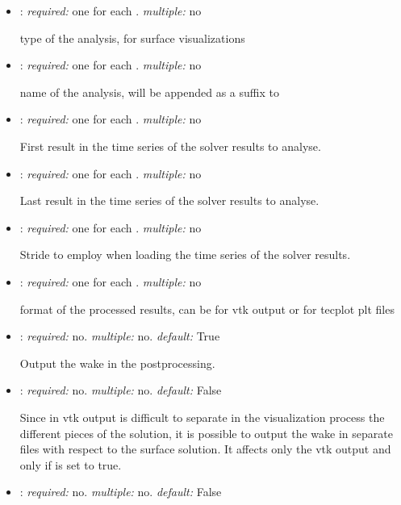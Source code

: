 \begin{itemize}
\item {}: \textit{required:} one for each . \textit{multiple:} no

type of the analysis,  for surface visualizations

\item {}: \textit{required:} one for each . \textit{multiple:} no

name of the analysis, will be appended as a suffix to 

\item {}: \textit{required:} one for each . \textit{multiple:} no

First result in the time series of the solver results to analyse.

\item {}: \textit{required:} one for each . \textit{multiple:} no

Last result in the time series of the solver results to analyse.

\item {}: \textit{required:} one for each . \textit{multiple:} no

Stride to employ when loading the time series of the solver results. 

\item {}: \textit{required:} one for each . \textit{multiple:} no

format of the processed results, can be  for vtk output or  for tecplot plt files

\item {}: \textit{required:} no. \textit{multiple:} no. \textit{default:} True

Output the wake in the postprocessing.

\item {}: \textit{required:} no. \textit{multiple:} no. \textit{default:} False

Since in vtk output is difficult to separate in the visualization process the different pieces of the solution, it is possible to output the wake in separate files with respect to the surface solution. It affects only the vtk output and only if  is set to true.

\item {}: \textit{required:} no. \textit{multiple:} no. \textit{default:} False


\end{itemize}
